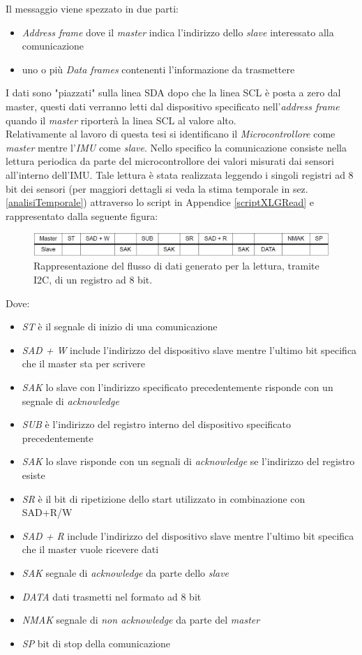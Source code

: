 Il messaggio viene spezzato in due parti:
	\begin{itemize}
		\item \textit{Address frame} dove il \textit{master} indica l'indirizzo dello \textit{slave} interessato alla comunicazione
		\item uno o più \textit{Data frames} contenenti l'informazione da trasmettere
	\end{itemize}
I dati sono "piazzati" sulla linea SDA dopo che la linea SCL è posta a zero dal master, questi dati verranno letti dal dispositivo specificato nell'\textit{address frame} quando il \textit{master} riporterà la linea SCL al valore alto.\\
Relativamente al lavoro di questa tesi si identificano il \textit{Microcontrollore} come \textit{master} mentre l'\textit{IMU} come \textit{slave}. Nello specifico la comunicazione consiste nella lettura periodica da parte del microcontrollore dei valori misurati dai sensori all'interno dell'IMU. Tale lettura è stata realizzata leggendo i singoli registri ad 8 bit dei sensori (per maggiori dettagli si veda la stima temporale in sez.\ref{analisiTemporale}) attraverso lo script in Appendice \ref{scriptXLGRead} e rappresentato dalla seguente figura:
\begin{figure}[H]  
	\centering 
	\includegraphics[scale=0.5]{implementazione/i2cRead.png}
	\caption{Rappresentazione del flusso di dati generato per la lettura, tramite I2C, di un registro ad 8 bit.}
	\label{fig:i2cRead}
\end{figure}
 Dove:
 \begin{itemize}
	\item  \textit{ST} è il segnale di inizio di una comunicazione
	\item \textit{SAD + W} include l'indirizzo del dispositivo slave mentre l'ultimo bit specifica che il master sta per scrivere
	\item \textit{SAK} lo slave con l'indirizzo specificato precedentemente risponde con un segnale di \textit{acknowledge}
	\item \textit{SUB} è l'indirizzo del registro interno del dispositivo specificato precedentemente
	\item \textit{SAK} lo slave risponde con un segnali di \textit{acknowledge} se l'indirizzo del registro esiste
	\item \textit{SR} è il bit di ripetizione dello start utilizzato in combinazione con SAD+R/W
	\item \textit{SAD + R} include l'indirizzo del dispositivo slave mentre l'ultimo bit specifica che il master vuole ricevere dati
	\item \textit{SAK} segnale di \textit{acknowledge} da parte dello \textit{slave}
	\item \textit{DATA} dati trasmetti nel formato ad 8 bit
	\item \textit{NMAK} segnale di  \textit{non acknowledge} da parte del \textit{master}
	\item \textit{SP} bit di stop della comunicazione
\end{itemize}
